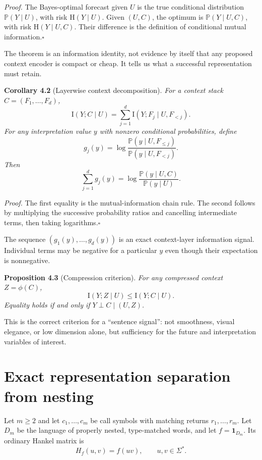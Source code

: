 \documentclass[11pt]{article}
\begin{document}
\emph{Proof.} The Bayes-optimal forecast given \(U\) is the true conditional distribution \(\mathbb{P}(Y\mid U)\), with risk \(\mathrm{H}(Y\mid U)\). Given \((U,C)\), the optimum is \(\mathbb{P}(Y\mid U,C)\), with risk \(\mathrm{H}(Y\mid U,C)\). Their difference is the definition of conditional mutual information.\hfill\(\square\)

The theorem is an information identity, not evidence by itself that any proposed context encoder is compact or cheap. It tells us what a successful representation must retain.

\label{cor:layerwise}
\textbf{Corollary 4.2} (Layerwise context decomposition). \emph{For a context stack \(C=(F_1,\ldots,F_d)\), \[\mathrm{I}(Y;C\mid U)
=
\sum_{j=1}^{d}\mathrm{I}(Y;F_j\mid U,F_{<j}).\] For any interpretation value \(y\) with nonzero conditional probabilities, define \[g_j(y)=
\log
\frac{\mathbb{P}(y\mid U,F_{\leq j})}
     {\mathbb{P}(y\mid U,F_{<j})}.\] Then \[\sum_{j=1}^{d}g_j(y)
=
\log
\frac{\mathbb{P}(y\mid U,C)}{\mathbb{P}(y\mid U)}.\]}

\emph{Proof.} The first equality is the mutual-information chain rule. The second follows by multiplying the successive probability ratios and cancelling intermediate terms, then taking logarithms.\hfill\(\square\)

The sequence \((g_1(y),\ldots,g_d(y))\) is an exact context-layer information signal. Individual terms may be negative for a particular \(y\) even though their expectation is nonnegative.

\textbf{Proposition 4.3} (Compression criterion). \emph{For any compressed context \(Z=\phi(C)\), \[\mathrm{I}(Y;Z\mid U)\leq\mathrm{I}(Y;C\mid U).\] Equality holds if and only if \(Y\perp C\mid(U,Z)\).}

This is the correct criterion for a ``sentence signal'': not smoothness, visual elegance, or low dimension alone, but sufficiency for the future and interpretation variables of interest.

\section{Exact representation separation from nesting}\label{exact-representation-separation-from-nesting}

Let \(m\geq2\) and let \(c_1,\ldots,c_m\) be call symbols with matching returns \(r_1,\ldots,r_m\). Let \(D_m\) be the language of properly nested, type-matched words, and let \(f=\mathbf 1_{D_m}\). Its ordinary Hankel matrix is \[H_f(u,v)=f(uv),
\qquad u,v\in\Sigma^*.\]
\end{document}
